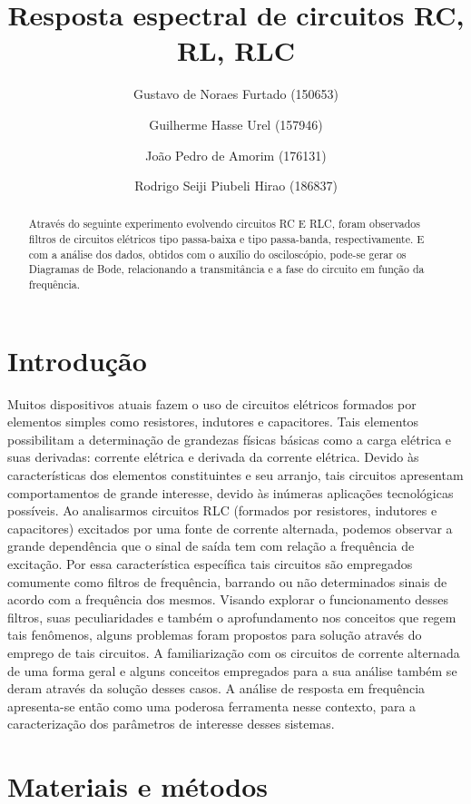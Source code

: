 \documentclass[a4paper]{article}
\title{Resposta espectral de circuitos RC, RL, RLC}
\author{
    Gustavo de Noraes Furtado (150653)
    \and 
	Guilherme Hasse Urel (157946)
    \and
	João Pedro de Amorim (176131)
	\and 
    Rodrigo Seiji Piubeli Hirao (186837)
    }
\begin{document}
\maketitle

\begin{abstract}
Através do seguinte experimento evolvendo circuitos RC E RLC, foram observados filtros de circuitos elétricos tipo passa-baixa e tipo passa-banda, respectivamente. E com a análise dos dados, obtidos com o auxílio do osciloscópio, pode-se gerar os Diagramas de Bode, relacionando a transmitância e a fase do circuito em função da frequência.
\end{abstract}

\section{Introdução}
	Muitos dispositivos atuais fazem o uso de circuitos elétricos formados por elementos simples como resistores, indutores e capacitores. Tais elementos possibilitam a determinação de grandezas físicas básicas como a carga elétrica e suas derivadas: corrente elétrica e derivada da corrente elétrica. Devido às características dos elementos constituintes e seu arranjo, tais circuitos apresentam comportamentos de grande interesse, devido às inúmeras aplicações tecnológicas possíveis. 
	Ao analisarmos circuitos RLC (formados por resistores, indutores e capacitores) excitados por uma fonte de corrente alternada, podemos observar a grande dependência que o sinal de saída tem com relação a frequência de excitação. Por essa característica específica tais circuitos são empregados comumente como filtros de frequência, barrando ou não determinados sinais de acordo com a frequência dos mesmos. Visando explorar o funcionamento desses filtros, suas peculiaridades e também o aprofundamento nos conceitos que regem tais fenômenos, alguns problemas foram propostos para solução através do emprego de tais circuitos. A familiarização com os circuitos de corrente alternada de uma forma geral e alguns conceitos empregados para a sua análise também se deram através da solução desses casos. A análise de resposta em frequência apresenta-se então como uma poderosa ferramenta nesse contexto, para a caracterização dos parâmetros de interesse desses  sistemas. 

\section{Materiais e métodos}
\end{document}
